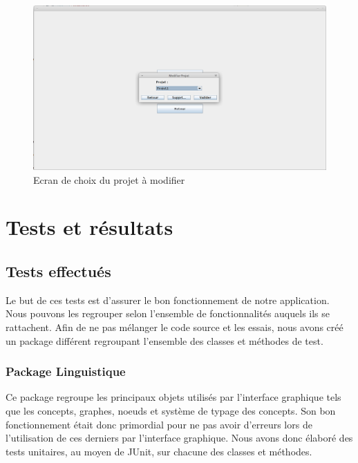 \documentclass[12pt]{report}
\begin{document}
\begin{figure}
\centering
\includegraphics[scale=0.3]{IHM/modifier_projet_admin.png}
\caption{Ecran de choix du projet à modifier}
\end{figure}


\chapter{Tests et résultats}
\section{Tests effectués}
Le but de ces tests est d'assurer le bon fonctionnement de notre application. Nous pouvons les regrouper selon l'ensemble de fonctionnalités auquels ils se rattachent. Afin de ne pas mélanger le code source et les essais, nous avons créé un package différent regroupant l'ensemble des classes et méthodes de test. 

\subsection{Package Linguistique}
Ce package regroupe les principaux objets utilisés par l'interface graphique tels que les concepts, graphes, noeuds et système de typage des concepts. Son bon fonctionnement était donc primordial pour ne pas avoir d'erreurs lors de l'utilisation de ces derniers par l'interface graphique. Nous avons donc élaboré des tests unitaires, au moyen de JUnit, sur chacune des classes et méthodes. 
\end{document}
